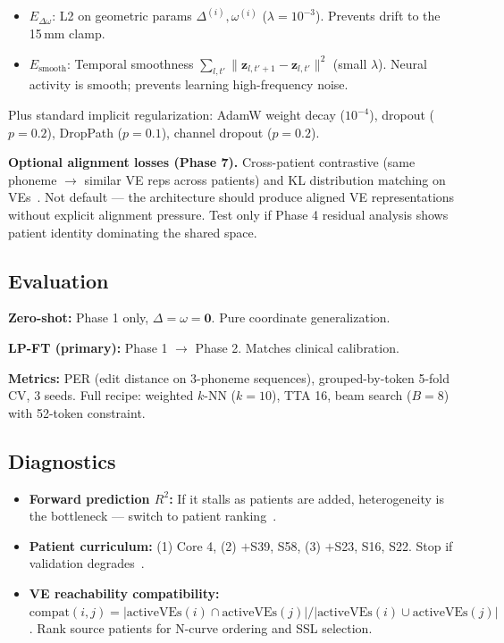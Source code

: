 \documentclass[11pt,letterpaper]{article}
\newcommand{\bfz}{\mathbf{z}}
\begin{document}
\begin{itemize}[leftmargin=2em]
\item $E_{\Delta\omega}$: L2 on geometric params $\Delta^{(i)}, \omega^{(i)}$ ($\lambda{=}10^{-3}$). Prevents drift to the 15\,mm clamp.
\item $E_{\text{smooth}}$: Temporal smoothness $\sum_{l,t'} \|\bfz_{l,t'+1} - \bfz_{l,t'}\|^2$ (small $\lambda$). Neural activity is smooth; prevents learning high-frequency noise.
\end{itemize}

Plus standard implicit regularization: AdamW weight decay ($10^{-4}$), dropout ($p{=}0.2$), DropPath ($p{=}0.1$), channel dropout ($p{=}0.2$).

\textbf{Optional alignment losses (Phase 7).} Cross-patient contrastive (same phoneme $\to$ similar VE reps across patients) and KL distribution matching on VEs~\cite{karpowicz2025nomad}. Not default --- the architecture should produce aligned VE representations without explicit alignment pressure. Test only if Phase 4 residual analysis shows patient identity dominating the shared space.


\subsection{Evaluation}

\textbf{Zero-shot:} Phase 1 only, $\Delta{=}\omega{=}\mathbf{0}$. Pure coordinate generalization.

\textbf{LP-FT (primary):} Phase 1 $\to$ Phase 2. Matches clinical calibration.

\textbf{Metrics:} PER (edit distance on 3-phoneme sequences), grouped-by-token 5-fold CV, 3 seeds. Full recipe: weighted $k$-NN ($k{=}10$), TTA 16, beam search ($B{=}8$) with 52-token constraint.

\subsection{Diagnostics}\label{sec:diagnostics}

\begin{itemize}[leftmargin=2em]
\item \textbf{Forward prediction $R^2$:} If it stalls as patients are added, heterogeneity is the bottleneck --- switch to patient ranking~\cite{jiang2025}.
\item \textbf{Patient curriculum:} (1) Core 4, (2) $+$S39, S58, (3) $+$S23, S16, S22. Stop if validation degrades~\cite{wu2025mibrain,jiang2025}.
\item \textbf{VE reachability compatibility:} $\text{compat}(i, j) = |\text{activeVEs}(i) \cap \text{activeVEs}(j)| / |\text{activeVEs}(i) \cup \text{activeVEs}(j)|$. Rank source patients for N-curve ordering and SSL selection.
\end{itemize}
\end{document}
